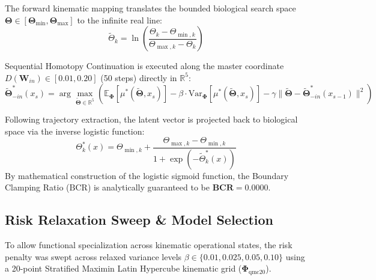 \documentclass[11pt,a4paper]{article}
\begin{document}
The forward kinematic mapping translates the bounded biological search space $\boldsymbol{\Theta} \in [\boldsymbol{\Theta}_{\min}, \boldsymbol{\Theta}_{\max}]$ to the infinite real line:
\begin{equation}
\tilde{\Theta}_k = \ln \left( \frac{\Theta_k - \Theta_{\min, k}}{\Theta_{\max, k} - \Theta_k} \right)
\end{equation}

Sequential Homotopy Continuation is executed along the master coordinate $D(\mathbf{W}_{in}) \in [0.01, 0.20]$ (50 steps) directly in $\mathbb{R}^5$:
\begin{equation}
\tilde{\boldsymbol{\Theta}}^*_{-in}(x_s) = \arg\max_{\tilde{\boldsymbol{\Theta}} \in \mathbb{R}^5} \left( \mathbb{E}_{\boldsymbol{\Phi}}[\mu^*(\tilde{\boldsymbol{\Theta}}, x_s)] - \beta \cdot \text{Var}_{\boldsymbol{\Phi}}[\mu^*(\tilde{\boldsymbol{\Theta}}, x_s)] - \gamma \|\tilde{\boldsymbol{\Theta}} - \tilde{\boldsymbol{\Theta}}^*_{-in}(x_{s-1})\|^2 \right)
\end{equation}

Following trajectory extraction, the latent vector is projected back to biological space via the inverse logistic function:
\begin{equation}
\Theta_k^*(x) = \Theta_{\min, k} + \frac{\Theta_{\max, k} - \Theta_{\min, k}}{1 + \exp(-\tilde{\Theta}_k^*(x))}
\end{equation}
By mathematical construction of the logistic sigmoid function, the Boundary Clamping Ratio ($\text{BCR}$) is analytically guaranteed to be $\mathbf{\text{BCR} = 0.0000}$.

\subsection{Risk Relaxation Sweep \& Model Selection}
To allow functional specialization across kinematic operational states, the risk penalty was swept across relaxed variance levels $\beta \in \{0.01, 0.025, 0.05, 0.10\}$ using a 20-point Stratified Maximin Latin Hypercube kinematic grid ($\boldsymbol{\Phi}_{\text{qmc20}}$).
\end{document}
